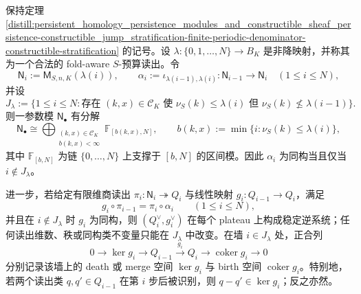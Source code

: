 \begin{proposition}\label{distill:persistent_homology_persistence_modules_and_constructible_sheaf_persistence-constructible_jump_stratification-fold-aware-plateau-wall-readout}
保持定理 \ref{distill:persistent_homology_persistence_modules_and_constructible_sheaf_persistence-constructible_jump_stratification-finite-periodic-denominator-constructible-stratification} 的记号。设
\(\lambda:\{0,1,\ldots,N\}\to B_K\) 是非降映射，并称其为一个合法的 fold-aware \(S\)-预算读出。令
\[
\mathsf N_i:=\mathsf M_{S,n,K}(\lambda(i)),
\qquad
\alpha_i:=\iota_{\lambda(i-1),\lambda(i)}:\mathsf N_{i-1}\to\mathsf N_i
\quad(1\le i\le N),
\]
并设
\[
J_\lambda:=\{1\le i\le N:\text{存在 }(k,x)\in\mathcal C_K
\text{ 使 }\nu_S(k)\le\lambda(i)\text{ 但 }\nu_S(k)\nleq\lambda(i-1)\}.
\]
则一参数模 \(\mathsf N_\bullet\) 有分解
\[
\mathsf N_\bullet\cong
\bigoplus_{\substack{(k,x)\in\mathcal C_K\\ b(k,x)<\infty}}
\mathbb F_{[b(k,x),N]},
\qquad
b(k,x):=\min\{i:\nu_S(k)\le\lambda(i)\},
\]
其中 \(\mathbb F_{[b,N]}\) 为链 \(\{0,\ldots,N\}\) 上支撑于 \([b,N]\) 的区间模。因此 \(\alpha_i\) 为同构当且仅当 \(i\notin J_\lambda\)。

进一步，若给定有限维商读出
\(\pi_i:\mathsf N_i\twoheadrightarrow Q_i\) 与线性映射
\(g_i:Q_{i-1}\to Q_i\)，满足
\[
g_i\circ\pi_{i-1}=\pi_i\circ\alpha_i
\qquad(1\le i\le N),
\]
并且在 \(i\notin J_\lambda\) 时 \(g_i\) 为同构，则 \((Q_i^\vee,g_i^\vee)\) 在每个 plateau 上构成稳定逆系统；任何读出维数、秩或同构类不变量只能在 \(J_\lambda\) 中改变。在墙 \(i\in J_\lambda\) 处，正合列
\[
0\longrightarrow\ker g_i\longrightarrow Q_{i-1}\xrightarrow{\ g_i\ }Q_i
\longrightarrow\operatorname{coker}g_i\longrightarrow0
\]
分别记录该墙上的 death 或 merge 空间 \(\ker g_i\) 与 birth 空间 \(\operatorname{coker}g_i\)。特别地，若两个读出类 \(q,q'\in Q_{i-1}\) 在第 \(i\) 步后被识别，则 \(q-q'\in\ker g_i\)；反之亦然。
\end{proposition}

